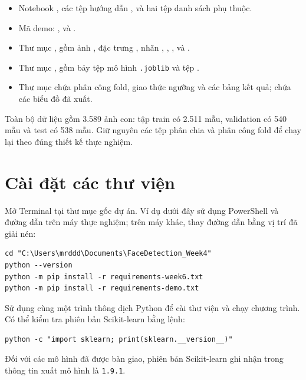 \documentclass[12pt,a4paper,oneside]{report}
\begin{document}
\begin{itemize}
    \item Notebook ,
    các tệp hướng dẫn , 
    và hai tệp danh sách phụ thuộc.
    \item Mã demo: , 
    và .
    \item Thư mục , gồm ảnh
    , đặc trưng ,
    nhãn , ,
    , 
    và .
    \item Thư mục , gồm bảy tệp mô hình
    \texttt{.joblib} và tệp .
    \item Thư mục  chứa phân công fold,
    giao thức ngưỡng và các bảng kết quả;
     chứa các biểu đồ đã xuất.
\end{itemize}

Toàn bộ dữ liệu gồm 3.589 ảnh con: tập train có 2.511 mẫu,
validation có 540 mẫu và test có 538 mẫu. Giữ nguyên các tệp phân chia
và phân công fold để chạy lại theo đúng thiết kế thực nghiệm.

\section{Cài đặt các thư viện}

Mở Terminal tại thư mục gốc dự án. Ví dụ dưới đây sử dụng PowerShell
và đường dẫn trên máy thực nghiệm; trên máy khác, thay đường dẫn
bằng vị trí đã giải nén:

\begin{lstlisting}[language={},numbers=none]
cd "C:\Users\mrddd\Documents\FaceDetection_Week4"
python --version
python -m pip install -r requirements-week6.txt
python -m pip install -r requirements-demo.txt
\end{lstlisting}

Sử dụng cùng một trình thông dịch Python để cài thư viện và chạy chương
trình. Có thể kiểm tra phiên bản Scikit-learn bằng lệnh:

\begin{lstlisting}[language={},numbers=none]
python -c "import sklearn; print(sklearn.__version__)"
\end{lstlisting}

Đối với các mô hình đã được bàn giao, phiên bản Scikit-learn ghi nhận
trong thông tin xuất mô hình là \texttt{1.9.1}.
\end{document}
